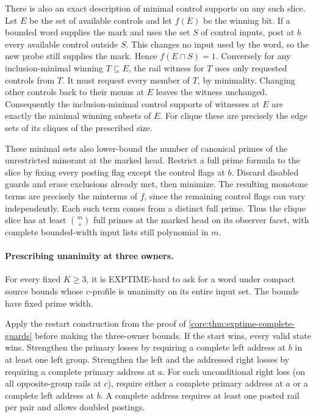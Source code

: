 There is also an exact description of minimal
control supports on any such slice. Let $E$ be
the set of available controls and let $f(E)$
be the winning bit. If a bounded word supplies
the mark and uses the set $S$ of control inputs,
post at $b$ every available control outside $S$.
This changes no input used by the word, so the
new probe still supplies the mark. Hence
$f(E\cap S)=1$. Conversely for any
inclusion-minimal winning $T\subseteq E$,
the rail witness for $T$ uses only requested
controls from $T$. It must request every
member of $T$, by minimality. Changing other
controls back to their menus at $E$ leaves
the witness unchanged. Consequently the
inclusion-minimal control supports of witnesses
at $E$ are exactly the minimal winning
subsets of $E$. For clique these are precisely
the edge sets of its cliques of the prescribed
size.

These minimal sets also lower-bound the number
of canonical primes of the unrestricted
minorant at the marked head. Restrict a full
prime formula to the slice by fixing every
posting flag except the control flags at $b$.
Discard disabled guards and erase exclusions
already met, then minimize. The resulting
monotone terms are precisely the minterms of
$f$, since the remaining control flags can
vary independently. Each such term comes from
a distinct full prime. Thus the clique slice
has at least $\binom{m}{s}$ full primes at
the marked head on its observer facet, with
complete bounded-width input lists still
polynomial in $m$.

\paragraph{Prescribing unanimity at three owners.}
For every fixed $K\ge3$, it is EXPTIME-hard to ask for a word
under compact source bounds whose $c$-profile is unanimity
on its entire input set. The bounds have fixed prime width.

Apply the restart construction from the proof of
\cref{core:thm:exptime-complete-guards} before making the
three-owner bounds. If the start wins, every valid state
wins. Strengthen the primary losses by requiring a complete
left address at $b$ in at least one left group. Strengthen
the left and the addressed right losses by requiring a
complete primary address at $a$. For each unconditional
right loss (on all opposite-group rails at $c$), require
either a complete primary address at $a$ or a complete
left address at $b$. A complete address requires at least
one posted rail per pair and allows doubled postings.

